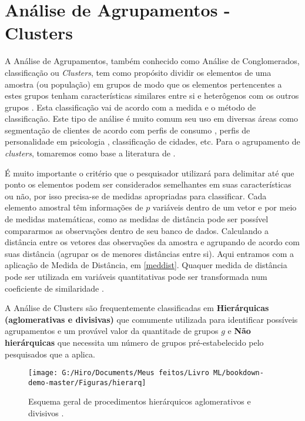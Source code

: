 \documentclass[
]{book}
\begin{document}
\hypertarget{anuxe1lise-de-agrupamentos---clusters}{%
\section{Análise de Agrupamentos - Clusters}\label{anuxe1lise-de-agrupamentos---clusters}}

A Análise de Agrupamentos, também conhecido como Análise de Conglomerados, classificação ou \emph{Clusters}, tem como propósito dividir os elementos de uma amostra (ou população) em grupos de modo que os elementos pertencentes a estes grupos tenham características similares entre si e heterôgenos com os outros grupos \citep{mingoti2007analise}. Esta classificação vai de acordo com a medida e o método de classificação. Este tipo de análise é muito comum seu uso em diversas áreas como segmentação de clientes de acordo com perfis de consumo \citep{punj1983cluster}, perfis de personalidade em psicologia \citep{speece1985classification}, classificação de cidades, etc. Para o agrupamento de \emph{clusters}, tomaremos como base a literatura de \citet{mingoti2007analise}.

É muito importante o critério que o pesquisador utilizará para delimitar até que ponto os elementos podem ser considerados semelhantes em suas características ou não, por isso precisa-se de medidas apropriadas para classificar. Cada elemento amostral têm informações de \(p\) variáveis dentro de um vetor e por meio de medidas matemáticas, como as medidas de distância pode ser possível compararmos as observações dentro de seu banco de dados. Calculando a distância entre os vetores das observações da amostra e agrupando de acordo com suas distância (agrupar os de menores distâncias entre si). Aqui entramos com a aplicação de Medida de Distância, em \ref{meddist}. Quaquer medida de distância pode ser utilizada em variáveis quantitativas pode ser transformada num coeficiente de similaridade \citep{mingoti2007analise}.

A Análise de Clusters são frequentemente classificadas em \textbf{Hierárquicas (aglomerativas e divisivas)} que comumente utilizada para identificar possíveis agrupamentos e um provável valor da quantitade de grupos \(g\) e \textbf{Não hierárquicas} que necessita um número de grupos pré-estabelecido pelo pesquisados que a aplica.

\begin{figure}

{\centering \texttt{[image: G:/Hiro/Documents/Meus feitos/Livro ML/bookdown-demo-master/Figuras/hierarq]} 

}

\caption{Esquema geral de procedimentos hierárquicos aglomerativos e divisivos \citep{mingoti2007analise}.}\label{fig:hierarq}
\end{figure}
\end{document}
